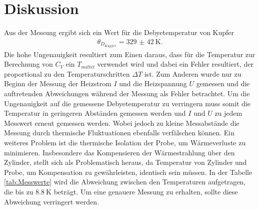 \section{Diskussion}
\label{sec:Diskussion}

Aus der Messung ergibt sich ein Wert für die Debyetemperatur von Kupfer
\begin{align}
\theta_{D_{Kupfer}} = \SI{329(42)}{\kelvin}.
\end{align}
Die hohe Ungenauigkeit resultiert zum Einen daraus, dass für die Temperatur zur Berechnung von
$C_V$ ein $T_{mittel}$ verwendet wird und dabei ein Fehler resultiert, der proportional
zu den Temperaturschritten $\Delta T$ ist. Zum Anderen wurde
nur zu Beginn der Messung der Heizstrom $I$ und die Heizspannung $U$
gemessen und die auftretenden Abweichungen während der Messung als Fehler betrachtet.
Um die Ungenauigkeit auf die gemessene Debyetemperatur zu verringern muss somit die
Temperatur in geringeren Abständen gemessen werden und $I$ und $U$ zu jedem
Messwert erneut gemessen werden. Wobei jedoch zu kleine
Messabstände die Messung durch thermische Fluktuationen ebenfalls verfälschen können.
Ein weiteres Problem ist die thermische Isolation der Probe, um Wärmeverluste zu minimieren. Insbesondere das Kompensieren der Wärmestrahlung über
den Zylinder, stellt sich als Problematisch heraus, da Temperatur von Zylinder und Probe, um Kompensation zu gewährleisten, identisch sein müssen.
In der Tabelle \ref{tab:Messwerte} wird die Abweichung zwischen den Temperaturen aufgetragen, die bis zu $\SI{8.8}{\kelvin}$
beträgt. Um eine genauere Messung zu erhalten, sollte diese Abweichung verringert werden.

